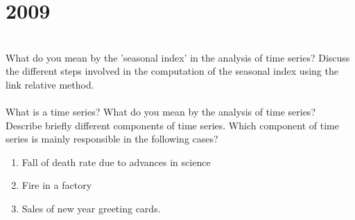 \section*{2009}
\vspace{-.5cm}
\hrulefill \smallskip\\
 What do you mean by the 'seasonal index' in the analysis of time series? Discuss the different steps involved in the computation of the seasonal index using the link relative method.
\\\\
 What is a time series? What do you mean by the analysis of time series? Describe briefly different components of time series. Which component of time series is mainly responsible in the following cases?
\begin{enumerate}[topsep=0pt, itemsep = -1ex,label=(\roman*)]
    \item Fall of death rate due to advances in science
    \item Fire in a factory
    \item Sales of new year greeting cards.
\end{enumerate}

